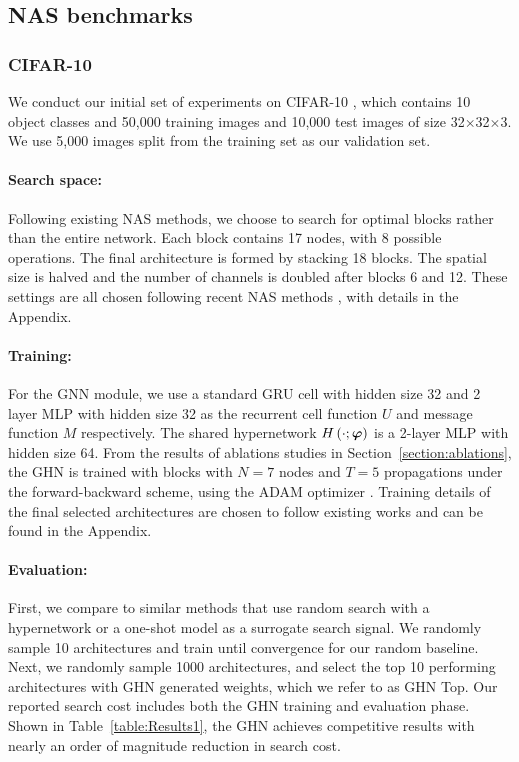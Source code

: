 \subsection{NAS benchmarks}




\subsubsection{CIFAR-10}
\label{section:cifar10}
We conduct our initial set of experiments on CIFAR-10 \citep{krizhevsky2009cifar}, which contains 10
object classes and 50,000 training images and 10,000 test images of size 32$\times$32$\times$3. We
use 5,000 images split from the training set as our validation set.

\vspace{-0.25cm}
\paragraph{Search space:} 
Following existing NAS methods, we choose to search for optimal blocks rather than the entire
network. Each block contains 17 nodes, with 8 possible operations. The final architecture is formed
by stacking 18 blocks. The spatial size is halved and the number of channels is doubled after blocks
6 and 12. These settings are all chosen following recent NAS methods
\citep{zoph2016neural,pham2018efficient,liu2018darts}, with details in the Appendix.

\vspace{-0.25cm}
\paragraph{Training:}
For the GNN module, we use a standard GRU cell \citep{cho14gru} with hidden size 32 and 2
layer MLP with hidden size 32 as the recurrent cell function $U$ and message function $M$
respectively. The shared hypernetwork $H \left(\cdot; {\bm{\varphi}}\right)$ is a 2-layer MLP with hidden
size 64. From the results of ablations studies in Section~\ref{section:ablations}, the GHN is
trained with blocks with $N=7$ nodes and $T=5$ propagations under the forward-backward scheme, using
the ADAM optimizer \citep{kingma2015adam}. Training details of the final selected architectures are
chosen to follow existing works and can be found in the Appendix.
\vspace{-0.25cm}
\paragraph{Evaluation:}
First, we compare to similar methods that use random search with a  hypernetwork or a one-shot model
as a surrogate search signal. We randomly sample 10 architectures and train until convergence for
our random baseline. Next, we randomly sample 1000 architectures, and select the top 10 performing
architectures with GHN generated weights, which we refer to as GHN Top. Our reported search cost
includes both the GHN training and evaluation phase. Shown in Table~\ref{table:Results1}, the GHN
achieves competitive results with nearly an order of magnitude reduction in search cost.


